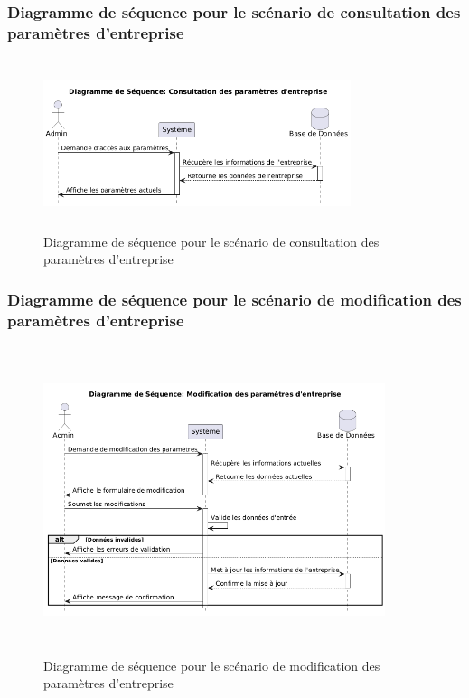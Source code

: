 \subsubsection{Diagramme de séquence pour le scénario de consultation des paramètres d'entreprise}
\begin{figure}[H]
    \centering
    \includegraphics[width=9cm,height=5cm]{images/consultparamcompanysq.png}
    \caption{Diagramme de séquence pour le scénario de consultation des paramètres d'entreprise}
\end{figure}

\subsubsection{Diagramme de séquence pour le scénario de modification des paramètres d'entreprise}
\begin{figure}[H]
    \centering
    \includegraphics[width=10cm,height=9cm]{images/modifyparamcompanysq.png}
    \caption{Diagramme de séquence pour le scénario de modification des paramètres d'entreprise}
\end{figure}

